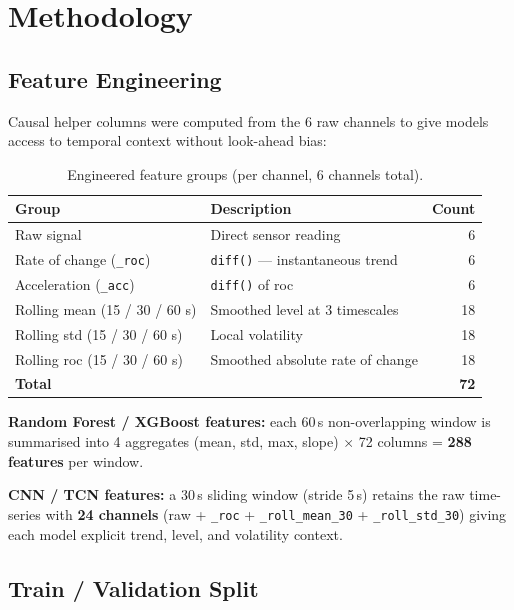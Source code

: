 \documentclass[11pt, a4paper]{article}
\begin{document}
\section{Methodology}

\subsection{Feature Engineering}

Causal helper columns were computed from the 6 raw channels to give models
access to temporal context without look-ahead bias:

\begin{table}[H]
\centering
\caption{Engineered feature groups (per channel, 6 channels total).}
\begin{tabular}{llr}
\toprule
\textbf{Group} & \textbf{Description} & \textbf{Count} \\
\midrule
Raw signal                    & Direct sensor reading              &  6 \\
Rate of change (\texttt{\_roc})   & \texttt{diff()} — instantaneous trend  &  6 \\
Acceleration (\texttt{\_acc})     & \texttt{diff()} of roc             &  6 \\
Rolling mean (15 / 30 / 60 s) & Smoothed level at 3 timescales     & 18 \\
Rolling std  (15 / 30 / 60 s) & Local volatility                   & 18 \\
Rolling roc  (15 / 30 / 60 s) & Smoothed absolute rate of change   & 18 \\
\midrule
\textbf{Total} & & \textbf{72} \\
\bottomrule
\end{tabular}
\end{table}

\textbf{Random Forest / XGBoost features:} each 60\,s non-overlapping window is
summarised into 4 aggregates (mean, std, max, slope) $\times$ 72 columns =
\textbf{288 features} per window.

\textbf{CNN / TCN features:} a 30\,s sliding window (stride 5\,s) retains the
raw time-series with \textbf{24 channels} (raw + \texttt{\_roc} +
\texttt{\_roll\_mean\_30} + \texttt{\_roll\_std\_30}) giving each model explicit
trend, level, and volatility context.

\subsection{Train / Validation Split}
\end{document}
